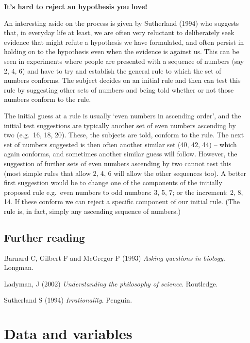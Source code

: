 \documentclass[]{book}
\begin{document}
\begin{advanced-box}
\textbf{It's hard to reject an hypothesis you love!}

An interesting aside on the process is given by Sutherland (1994) who
suggests that, in everyday life at least, we are often very reluctant to
deliberately seek evidence that might refute a hypothesis we have
formulated, and often persist in holding on to the hypothesis even when
the evidence is against us. This can be seen in experiments where people
are presented with a sequence of numbers (say 2, 4, 6) and have to try
and establish the general rule to which the set of numbers conforms. The
subject decides on an initial rule and then can test this rule by
suggesting other sets of numbers and being told whether or not those
numbers conform to the rule.

The initial guess at a rule is usually `even numbers in ascending
order', and the initial test suggestions are typically another set of
even numbers ascending by two (e.g.~16, 18, 20). These, the subjects are
told, conform to the rule. The next set of numbers suggested is then
often another similar set (40, 42, 44) -- which again conforms, and
sometimes another similar guess will follow. However, the suggestion of
further sets of even numbers ascending by two cannot test this (most
simple rules that allow 2, 4, 6 will allow the other sequences too). A
better first suggestion would be to change one of the components of the
initially proposed rule e.g.~even numbers to odd numbers: 3, 5, 7; or
the increment: 2, 8, 14. If these conform we can reject a specific
component of our initial rule. (The rule is, in fact, simply any
ascending sequence of numbers.)
\end{advanced-box}

\section{Further reading}\label{further-reading}

Barnard C, Gilbert F and McGregor P (1993) \emph{Asking questions in
biology}. Longman.

Ladyman, J (2002) \emph{Understanding the philosophy of science}.
Routledge.

Sutherland S (1994) \emph{Irrationality}. Penguin.

\hypertarget{data-and-variables}{\chapter{Data and
variables}\label{data-and-variables}}
\end{document}
